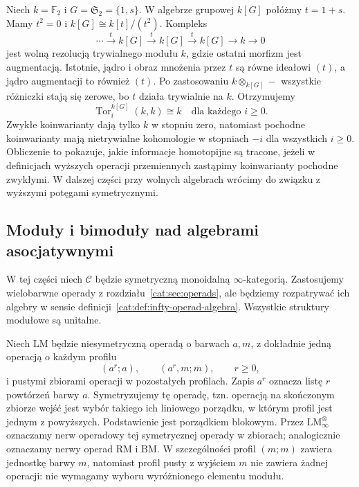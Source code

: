 \begin{przyklad}\label{cat:ex:infty-positive-char-derived-orbits}
Niech $k=\mathbb F_2$ i $G=\mathfrak S_2=\{1,s\}$. W algebrze grupowej $k[G]$ połóżmy $t=1+s$. Mamy $t^2=0$ i $k[G]\cong k[t]/(t^2)$. Kompleks
\[
 \cdots\xrightarrow{t} k[G]\xrightarrow{t}k[G]
 \xrightarrow{t}k[G]\longrightarrow k\longrightarrow0
\]
jest wolną rezolucją trywialnego modułu $k$, gdzie ostatni morfizm jest augmentacją. Istotnie, jądro i obraz mnożenia przez $t$ są równe ideałowi $(t)$, a jądro augmentacji to również $(t)$. Po zastosowaniu $k\otimes_{k[G]}-$ wszystkie różniczki stają się zerowe, bo $t$ działa trywialnie na $k$. Otrzymujemy
\[
 \operatorname{Tor}^{k[G]}_i(k,k)\cong k
 \quad\text{dla każdego }i\geq0.
\]
Zwykłe koinwarianty dają tylko $k$ w stopniu zero, natomiast pochodne koinwarianty mają nietrywialne kohomologie w stopniach $-i$ dla wszystkich $i\geq0$. Obliczenie to pokazuje, jakie informacje homotopijne są tracone, jeżeli w definicjach wyższych operacji przemiennych zastąpimy koinwarianty pochodne zwykłymi. W dalszej części przy wolnych algebrach wrócimy do związku z wyższymi potęgami symetrycznymi.
\end{przyklad}

\subsection{Moduły i bimoduły nad algebrami asocjatywnymi}

W tej części niech $\mathcal C$ będzie symetryczną monoidalną $\infty$-kategorią. Zastosujemy wielobarwne operady z rozdziału~\ref{cat:sec:operads}, ale będziemy rozpatrywać ich algebry w sensie definicji~\ref{cat:def:infty-operad-algebra}. Wszystkie struktury modułowe są unitalne.

\begin{definicja}\label{cat:def:infty-left-module-operad}
Niech $\mathrm{LM}$ będzie niesymetryczną operadą o barwach $a,m$, z dokładnie jedną operacją o każdym profilu
\[
 (a^r;a),\qquad (a^r,m;m),\qquad r\geq0,
\]
i pustymi zbiorami operacji w pozostałych profilach. Zapis $a^r$ oznacza listę $r$ powtórzeń barwy $a$. Symetryzujemy tę operadę, tzn. operacją na skończonym zbiorze wejść jest wybór takiego ich liniowego porządku, w którym profil jest jednym z powyższych. Podstawienie jest porządkiem blokowym. Przez $\mathrm{LM}^\otimes_\infty$ oznaczamy nerw operadowy tej symetrycznej operady w zbiorach; analogicznie oznaczamy nerwy operad $\mathrm{RM}$ i $\mathrm{BM}$. W szczególności profil $(m;m)$ zawiera jednostkę barwy $m$, natomiast profil pusty z wyjściem $m$ nie zawiera żadnej operacji: nie wymagamy wyboru wyróżnionego elementu modułu.
\end{definicja}

